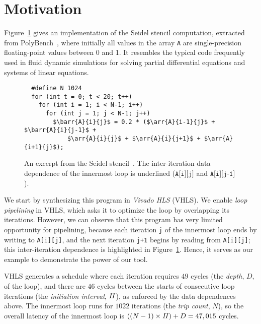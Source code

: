 \section{Motivation}
\label{lo:sec:motivation}

\newcommand\arr[3]{\texttt{#1[#2][#3]}}
\newcommand\barr[3]{\texttt{\underline{#1[#2][#3]}}}

Figure~\ref{lo:fig:seidel_prog} gives an implementation of the Seidel stencil
computation, extracted from PolyBench~\cite{polybench}, where initially all
values in the array \verb|A| are single-precision floating-point values between
0 and 1.  It resembles the typical code frequently used in fluid dynamic
simulations for solving partial differential equations and systems of linear
equations.

\begin{figure}[ht]
\begin{lstlisting}
  #define N 1024
  for (int t = 0; t < 20; t++)
    for (int i = 1; i < N-1; i++)
      for (int j = 1; j < N-1; j++)
        $\barr{A}{i}{j}$ = 0.2 * ($\arr{A}{i-1}{j}$ + $\barr{A}{i}{j-1}$ +
            $\arr{A}{i}{j}$ + $\arr{A}{i}{j+1}$ + $\arr{A}{i+1}{j}$);
\end{lstlisting}
    \caption{%
    An excerpt from the Seidel stencil~\cite{polybench}.  The inter-iteration
    data dependence of the innermost loop is underlined ($\arr{A}{i}{j}$ and
    $\arr{A}{i}{j-1}$).}
    \label{lo:fig:seidel_prog}
\end{figure}

We start by synthesizing this program in \emph{Vivado HLS} (VHLS)\@.  We
enable \emph{loop pipelining} in VHLS, which asks it to optimize the loop by
overlapping its iterations.  However, we can observe that this program has
very limited opportunity for pipelining, because each iteration \verb|j| of
the innermost loop ends by writing to \verb|A[i][j]|, and the next iteration
\verb|j+1| begins by reading from \verb|A[i][j]|; this inter-iteration
dependence is highlighted in Figure~\ref{lo:fig:seidel_prog}.  Hence, it serves
as our example to demonstrate the power of our tool.

VHLS generates a schedule where each iteration requires $49$ cycles (the
\emph{depth}, $D$, of the loop), and there are $46$ cycles between the starts
of consecutive loop iterations (the \emph{initiation interval}, $\mathit{II}$),
as enforced by the data dependences above.  The innermost loop runs for
$1022$ iterations (the \emph{trip count}, $N$), so the overall latency of the
innermost loop is $((N-1) \times \mathit{II}) + D = 47,015$ cycles.

